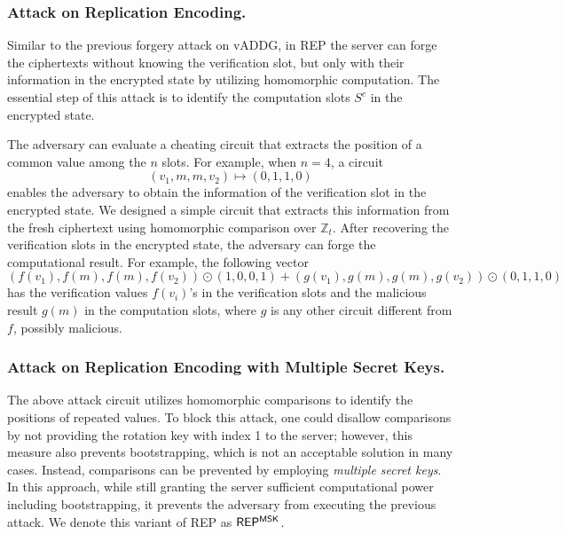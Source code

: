 \documentclass[runningheads]{llncs}
\newcommand{\REP}{\textsf{REP}{}}
\begin{document}
        \subsubsection{Attack on Replication Encoding.}
        Similar to the previous forgery attack on vADDG, in \REP{} the server can forge the ciphertexts without knowing the verification slot, but only with their information in the encrypted state by utilizing homomorphic computation. The essential step of this attack is to identify the computation slots \(S^c\) in the encrypted state.

        The adversary can evaluate a cheating circuit that extracts the position of a common value among the \(n\) slots. For example, when \(n=4\), a circuit 
        \[(v_1, m, m, v_2) \mapsto (0, 1, 1, 0)\]
        enables the adversary to obtain the information of the verification slot in the encrypted state.
        We designed a simple circuit that extracts this information from the fresh ciphertext using homomorphic comparison over \(\mathbb{Z}_t\). 
        After recovering the verification slots in the encrypted state, the adversary can forge the computational result. For example, the following vector 
        \[(f(v_1), f(m), f(m), f(v_2)) \odot (1, 0, 0, 1) + (g(v_1), g(m), g(m), g(v_2)) \odot (0, 1, 1, 0)\]
        has the verification values \(f(v_i)\)'s in the verification slots and the malicious result \(g(m)\) in the computation slots, where \(g\) is any other circuit different from \(f\), possibly malicious.

        \subsubsection{Attack on Replication Encoding with Multiple Secret Keys.}
        The above attack circuit utilizes homomorphic comparisons to identify the positions of repeated values. To block this attack, one could disallow comparisons by not providing the rotation key with index 1 to the server; however, this measure also prevents bootstrapping, which is not an acceptable solution in many cases.
        Instead, comparisons can be prevented by employing \emph{multiple secret keys}. In this approach, while still granting the server sufficient computational power including bootstrapping, it prevents the adversary from executing the previous attack. We denote this variant of \REP{} as $\REP^{\sf MSK}$.
\end{document}
